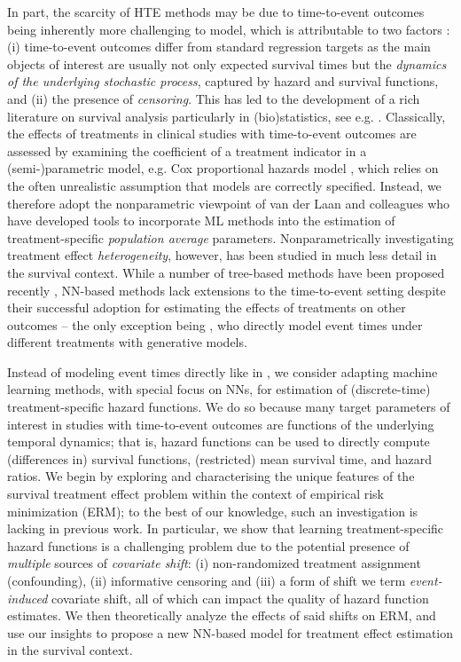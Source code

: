 \documentclass{article}
\newcommand*\CL{\color{blue}}
\begin{document}
In part, the scarcity of HTE methods may be due to time-to-event outcomes being inherently more challenging to model, which is attributable to two factors \cite{tutz2016modeling}: (i) time-to-event outcomes differ from standard regression targets as the main objects of interest are usually not only expected survival times but the \textit{dynamics of the underlying stochastic process}, captured by hazard and survival functions, and (ii) the presence of \textit{censoring}. This has led to the development of a rich literature on survival analysis particularly in (bio)statistics, see e.g. \cite{tutz2016modeling, klein2003survival}. Classically, the effects of treatments in clinical studies with time-to-event outcomes are assessed by examining the coefficient of a treatment indicator in a (semi-)parametric model, e.g. Cox proportional hazards model \cite{Cox:72}, which relies on the often unrealistic assumption that models are correctly specified. Instead, we therefore adopt the nonparametric viewpoint of van der Laan and colleagues \cite{van2011targeted, stitelman2010collaborative, stitelman2011targeted, cai2019targeted} who have developed tools to incorporate ML methods into the estimation of treatment-specific \textit{population average} parameters. Nonparametrically investigating treatment effect \textit{heterogeneity}, however, has been studied in much less detail in the survival context. While a number of tree-based methods have been proposed recently \cite{tabib2020non, henderson2020individualized, zhang2017mining, cui2020estimating}, NN-based methods lack extensions to the time-to-event setting despite their successful adoption for estimating the effects of treatments on other outcomes --  the only exception being \cite{chapfuwa2021enabling}, who directly model event times under different treatments with generative models. 

Instead of modeling event times directly like in \cite{chapfuwa2021enabling}, we consider adapting machine learning methods, with special focus on NNs, for estimation of (discrete-time) treatment-specific hazard functions. We do so because many target parameters of interest in studies with time-to-event outcomes are functions of the underlying temporal dynamics; that is, hazard functions can be used to directly compute (differences in) survival functions, (restricted) mean survival time, and hazard ratios. We begin by exploring and characterising the unique features of the survival treatment effect problem within the context of empirical risk minimization (ERM); to the best of our knowledge, such an investigation is lacking in previous work. In particular, we show that learning treatment-specific hazard functions is a challenging problem due to the potential presence of \textit{multiple} sources of \textit{covariate shift}: (i) non-randomized treatment assignment (confounding), (ii) informative censoring and (iii) a form of shift we term \textit{event-induced} covariate shift, all of which can impact the quality of hazard function estimates.  We then theoretically analyze the effects of said shifts on ERM, and use our insights to propose a new NN-based model for treatment effect estimation in the survival context.
\end{document}
